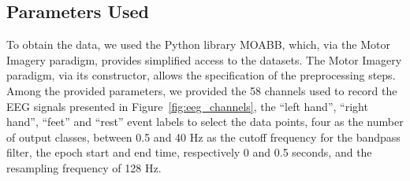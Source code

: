 \subsection*{Parameters Used}
To obtain the data, we used the Python library MOABB, which, via the Motor Imagery paradigm, provides simplified access to the datasets.
The Motor Imagery paradigm, via its constructor, allows the specification of the preprocessing steps.
Among the provided parameters, we provided the 58 channels used to record the EEG signals presented in Figure~\ref{fig:eeg_channels}, the ``left hand'', ``right hand'', ``feet'' and ``rest'' event labels to select the data points, four as the number of output classes, between 0.5 and 40 Hz as the cutoff frequency for the bandpass filter, the epoch start and end time, respectively 0 and 0.5 seconds, and the resampling frequency of 128 Hz.


